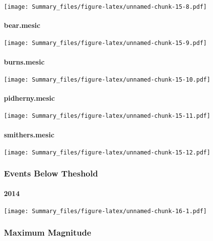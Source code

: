 \documentclass[
]{article}
\begin{document}
\texttt{[image: Summary\_files/figure-latex/unnamed-chunk-15-8.pdf]}

\hypertarget{bear.mesic}{%
\paragraph{bear.mesic}\label{bear.mesic}}

\texttt{[image: Summary\_files/figure-latex/unnamed-chunk-15-9.pdf]}

\hypertarget{burns.mesic}{%
\paragraph{burns.mesic}\label{burns.mesic}}

\texttt{[image: Summary\_files/figure-latex/unnamed-chunk-15-10.pdf]}

\hypertarget{pidherny.mesic}{%
\paragraph{pidherny.mesic}\label{pidherny.mesic}}

\texttt{[image: Summary\_files/figure-latex/unnamed-chunk-15-11.pdf]}

\hypertarget{smithers.mesic}{%
\paragraph{smithers.mesic}\label{smithers.mesic}}

\texttt{[image: Summary\_files/figure-latex/unnamed-chunk-15-12.pdf]}

\hypertarget{events-below-theshold}{%
\subsubsection{Events Below Theshold}\label{events-below-theshold}}

\hypertarget{section-15}{%
\paragraph{2014}\label{section-15}}

\texttt{[image: Summary\_files/figure-latex/unnamed-chunk-16-1.pdf]}

\hypertarget{maximum-magnitude}{%
\subsubsection{Maximum Magnitude}\label{maximum-magnitude}}
\end{document}
